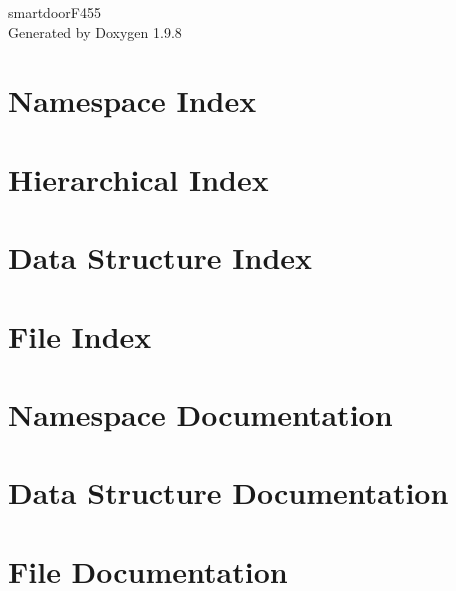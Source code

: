 \documentclass[twoside]{book}
\newcommand{\+}{\discretionary{\mbox{\scriptsize$\hookleftarrow$}}{}{}}
\newcommand{\clearemptydoublepage}{%
    \newpage{\pagestyle{empty}\cleardoublepage}%
  }
\begin{document}
  \raggedbottom
    \hypersetup{pageanchor=false,
                bookmarksnumbered=true,
                pdfencoding=unicode
               }
  \begin{titlepage}
  \vspace*{7cm}
  \begin{center}%
  {\Large smartdoor\+F455}\\
  \vspace*{1cm}
  {\large Generated by Doxygen 1.9.8}\\
  \end{center}
  \end{titlepage}
  \clearemptydoublepage
  \tableofcontents
  \clearemptydoublepage
  \hypersetup{pageanchor=true}
\chapter{Namespace Index}

\chapter{Hierarchical Index}

\chapter{Data Structure Index}

\chapter{File Index}

\chapter{Namespace Documentation}

\chapter{Data Structure Documentation}





\chapter{File Documentation}









  \backmatter
  \newpage
  \clearemptydoublepage
  \printindex
\end{document}
